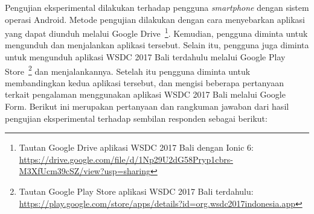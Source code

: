 Pengujian eksperimental dilakukan terhadap pengguna \textit{smartphone} dengan sistem operasi Android. Metode pengujian dilakukan dengan cara menyebarkan aplikasi yang dapat diunduh melalui Google Drive~\footnote{Tautan Google Drive aplikasi WSDC 2017 Bali dengan Ionic 6: \url{https://drive.google.com/file/d/1Np29U2dG58Pryp1cbrs-M3XfUcm39cSZ/view?usp=sharing}}. Kemudian, pengguna diminta untuk mengunduh dan menjalankan aplikasi tersebut. Selain itu, pengguna juga diminta untuk mengunduh aplikasi WSDC 2017 Bali terdahulu melalui Google Play Store~\footnote{Tautan Google Play Store aplikasi WSDC 2017 Bali terdahulu: \url{https://play.google.com/store/apps/details?id=org.wsdc2017indonesia.app}} dan menjalankannya. Setelah itu pengguna diminta untuk membandingkan kedua aplikasi tersebut, dan mengisi beberapa pertanyaan terkait pengalaman menggunakan aplikasi WSDC 2017 Bali melalui Google Form. Berikut ini merupakan pertanyaan dan rangkuman jawaban dari hasil pengujian eksperimental terhadap sembilan responden sebagai berikut:

